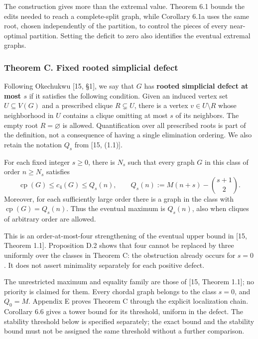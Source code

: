 \documentclass[english,11pt,a4paper]{article}
\begin{document}
The construction gives more than the extremal value. Theorem 6.1 bounds the edits needed to reach a complete-split graph, while Corollary 6.1a uses the same root, chosen independently of the partition, to control the pieces of every near-optimal partition. Setting the deficit to zero also identifies the eventual extremal graphs.

\subsubsection{Theorem C. Fixed rooted simplicial defect}\label{theorem-c.-fixed-rooted-simplicial-defect}

Following Okechukwu {[}15, §1{]}, we say that \(G\) has \textbf{rooted simplicial defect at most \(s\)} if it satisfies the following condition. Given an induced vertex set \(U\subseteq V(G)\) and a prescribed clique \(R\subsetneq U\), there is a vertex \(v\in U\setminus R\) whose neighborhood in \(U\) contains a clique omitting at most \(s\) of its neighbors. The empty root \(R=\varnothing\) is allowed. Quantification over all prescribed roots is part of the definition, not a consequence of having a single elimination ordering. We also retain the notation \(Q_s\) from {[}15, (1.1){]}.

For each fixed integer \(s\ge0\), there is \(N_s\) such that every graph \(G\) in this class of order \(n\ge N_s\) satisfies \[
\operatorname{cp}(G)\le c_4(G)\le Q_s(n),
\qquad
Q_s(n):=M(n+s)-\binom{s+1}{2}.
\tag{C}
\] Moreover, for each sufficiently large order there is a graph in the class with \(\operatorname{cp}(G)=Q_s(n)\). Thus the eventual maximum is \(Q_s(n)\), also when cliques of arbitrary order are allowed.

This is an order-at-most-four strengthening of the eventual upper bound in {[}15, Theorem 1.1{]}. Proposition D.2 shows that four cannot be replaced by three uniformly over the classes in Theorem C: the obstruction already occurs for \(s=0\). It does not assert minimality separately for each positive defect.

The unrestricted maximum and equality family are those of {[}15, Theorem 1.1{]}; no priority is claimed for them. Every chordal graph belongs to the class \(s=0\), and \(Q_0=M\). Appendix E proves Theorem C through the explicit localization chain. Corollary 6.6 gives a tower bound for its threshold, uniform in the defect. The stability threshold below is specified separately; the exact bound and the stability bound must not be assigned the same threshold without a further comparison.
\end{document}
